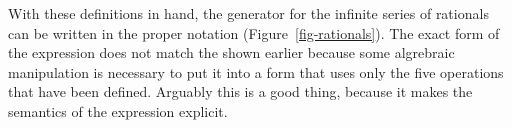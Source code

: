 With these definitions in hand, the generator for the infinite series of rationals can be written in the proper notation (Figure~\ref{fig-rationals}). The exact form of the expression does not match the shown earlier because some algrebraic manipulation is necessary to put it into a form that uses only the five operations that have been defined. Arguably this is a good thing, because it makes the semantics of the expression explicit.
